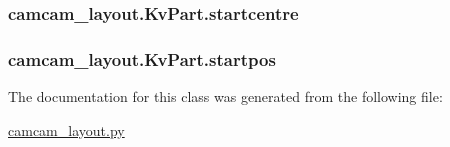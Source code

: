\subsubsection[{startcentre}]{\setlength{\rightskip}{0pt plus 5cm}camcam\+\_\+layout.\+Kv\+Part.\+startcentre}\label{classcamcam__layout_1_1_kv_part_adbf6e3a41fb3ebaf219b7c948fc68ee7}
\hypertarget{classcamcam__layout_1_1_kv_part_aa7d453718127aa8315189cbc3675a5f6}{}
\subsubsection[{startpos}]{\setlength{\rightskip}{0pt plus 5cm}camcam\+\_\+layout.\+Kv\+Part.\+startpos}\label{classcamcam__layout_1_1_kv_part_aa7d453718127aa8315189cbc3675a5f6}


The documentation for this class was generated from the following file\+:\begin{DoxyCompactItemize}
\item 
\hyperlink{camcam__layout_8py}{camcam\+\_\+layout.\+py}\end{DoxyCompactItemize}
